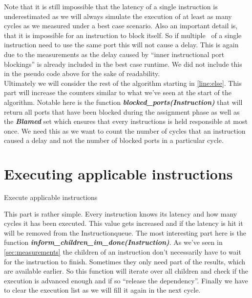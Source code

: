 Note that it is still impossible that the latency of a single instruction is underestimated as we will always simulate the execution of at least as many cycles as we measured under a best case scenario. Also an important detail is, that it is impossible for an instruction to block itself. So if multiple \microops\ of a single instruction need to use the same port this will not cause a delay. This is again due to the measurements as the delay caused by ``inner instructional port blockings'' is already included in the best case runtime. We did not include this in the pseudo code above for the sake of readability.\\

Ultimately we will consider the rest of the algorithm starting in \autoref{line:else}. This part will increase the counters similar to what we've seen at the start of the algorithm. Notable here is the function \textbf{\emph{blocked\_ports(Instruction)}} that will return all ports that have been blocked during the assignment phase as well as the \textbf{\emph{Blamed}} set which ensures that every instructions is held responsible at most once. We need this as we want to count the number of cycles that an instruction caused a delay and not the number of blocked ports in a particular cycle.



\section{Executing applicable instructions}
\label{sec:execute}

\begin{algorithm}[H]
    \SetAlgoLined
    \caption{Execute applicable instructions}
    \label{alg:execute}
\end{algorithm}

This part is rather simple. Every instruction knows its latency and how many cycles it has been executed. This value gets increased and if the latency is hit it will be removed from the Instructionqueue. The most interesting part here is the function \textbf{\emph{inform\_children\_im\_done(Instruction)}}. As we've seen in \autoref{sec:measurements} the children of an instruction don't necessarily have to wait for the instruction to finish. Sometimes they only need part of the results, which are available earlier. So this function will iterate over all children and check if the execution is advanced enough and if so ``release the dependency''. Finally we have to clear the execution list as we will fill it again in the next cycle.

